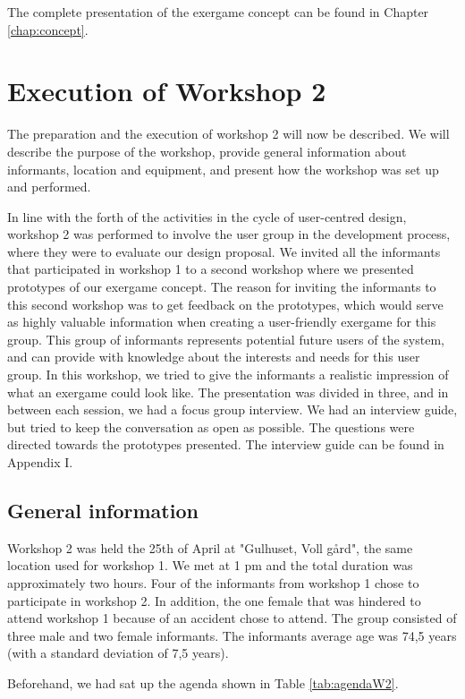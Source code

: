 The complete presentation of the exergame concept can be found in Chapter \ref{chap:concept}.
 
\section{Execution of Workshop 2}
\label{sec:ws2}
The preparation and the execution of workshop 2 will now be described. We will describe the purpose of the workshop, provide general information about informants, location and equipment, and present how the workshop was set up and performed. 

In line with the forth of the activities in the cycle of user-centred design, workshop 2 was performed to involve the user group in the development process, where they were to evaluate our design proposal. We invited all the informants that participated in workshop 1 to a second workshop where we presented prototypes of our exergame concept. The reason for inviting the informants to this second workshop was to get feedback on the prototypes, which would serve as highly valuable information when creating a user-friendly exergame for this group. This group of informants represents potential future users of the system, and can provide with knowledge about the interests and needs for this user group. In this workshop, we tried to give the informants a realistic impression of what an exergame could look like. The presentation was divided in three, and in between each session, we had a focus group interview. We had an interview guide, but tried to keep the conversation as open as possible. The questions were directed towards the prototypes presented. The interview guide  can be found in Appendix I.

\subsection{General information}
Workshop 2 was held the 25th of April at "Gulhuset, Voll gård", the same location used for workshop 1. We met at 1 pm and the total duration was approximately two hours. Four of the informants from workshop 1 chose to participate in workshop 2. In addition, the one female that was hindered to attend workshop 1 because of an accident chose to attend. The group consisted of three male and two female informants. The informants average age was 74,5 years (with a standard deviation of 7,5 years).  

Beforehand, we had sat up the agenda shown in Table \ref{tab:agendaW2}. 


